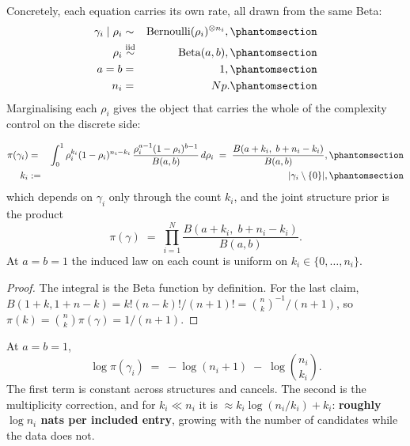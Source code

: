 Concretely, each equation carries its own rate, all drawn from the same Beta:
\begin{eqnarray}
\gamma_i\mid\rho_i &\sim& \operatorname{Bernoulli}(\rho_i)^{\otimes n_i},
  \Elabel{E-96A}{E96_A} \\
\rho_i &\overset{\text{iid}}{\sim}& \operatorname{Beta}(a,b),
  \Elabel{E-96B}{E96_B} \\
a = b &=& 1,
  \Elabel{E-96C}{E96_C} \\
n_i &=& Np.
  \Elabel{E-96D}{E96_D}
\end{eqnarray}
Marginalising each $\rho_i$ gives the object that carries the whole of the complexity
control on the discrete side:

\begin{proposition}\label{prop:sprior}
\begin{eqnarray}
\pi(\gamma_i) &=& \int_0^1 \rho_i^{k_i}(1-\rho_i)^{n_i-k_i}\,
  \frac{\rho_i^{a-1}(1-\rho_i)^{b-1}}{B(a,b)}\,d\rho_i \;=\;
  \frac{B(a+k_i,\; b+n_i-k_i)}{B(a,b)},
  \Elabel{E-111A}{E111_A} \\
k_i &:=& |\gamma_i\setminus\{0\}|,
  \Elabel{E-111B}{E111_B}
\end{eqnarray}
which depends on $\gamma_i$ only through the count $k_i$, and the joint structure
prior is the product
\begin{equation}
\pi(\gamma) \;=\; \prod_{i=1}^{N}\frac{B(a+k_i,\; b+n_i-k_i)}{B(a,b)}.
\tag{E-135}\label{E135}
\end{equation}
At $a=b=1$ the induced law on each count is uniform on $k_i\in\{0,\dots,n_i\}$.
\end{proposition}

\begin{proof}
The integral is the Beta function by definition. For the last claim,
$B(1+k,1+n-k)=k!(n-k)!/(n+1)!=\binom{n}{k}^{-1}/(n+1)$, so
$\pi(k)=\binom{n}{k}\pi(\gamma)=1/(n+1)$.
\end{proof}

\begin{corollary}\label{cor:mult}
At $a=b=1$,
\begin{equation}
\log\pi(\gamma_i) \;=\; -\log(n_i+1) \;-\; \log\binom{n_i}{k_i}.
\tag{E-112}\label{E112}
\end{equation}
The first term is constant across structures and cancels. The second is the
multiplicity correction, and for $k_i\ll n_i$ it is $\approx k_i\log(n_i/k_i)+k_i$:
\textbf{roughly $\log n_i$ nats per included entry}, growing with the number of
candidates while the data does not.
\end{corollary}

